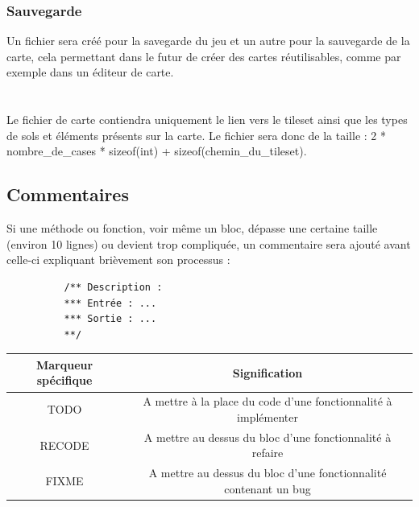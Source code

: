 \documentclass[a4paper]{article}
\newcommand{\alinea}{\hspace*{0.5cm}}
\begin{document}
        \subsubsection{Sauvegarde}
		  \alinea Un fichier sera créé pour la savegarde du jeu et un autre pour la sauvegarde de la carte, cela permettant dans le futur de créer des cartes réutilisables, comme par exemple dans un éditeur de carte.\\
		  \\
		  \alinea %
		  \\
		  \alinea Le fichier de carte contiendra uniquement le lien vers le tileset ainsi que les types de sols et éléments présents sur la carte. Le fichier sera donc de la taille : 2 * nombre\_de\_cases * sizeof(int) + sizeof(chemin\_du\_tileset).\\
      
      \subsection{Commentaires}
        \alinea Si une méthode ou fonction, voir même un bloc, dépasse une certaine taille (environ 10 lignes) ou devient trop compliquée, un commentaire sera ajouté avant celle-ci expliquant brièvement son processus :
        \begin{verbatim}
          /** Description :
          *** Entrée : ...
          *** Sortie : ...
          **/
        \end{verbatim}
        \begin{small}
          \begin{tabular}{| c | c |}
            \hline
            \textbf{Marqueur spécifique} & \textbf{Signification}\\
            \hline
            TODO & A mettre à la place du code d'une fonctionnalité à implémenter\\
            \hline
            RECODE & A mettre au dessus du bloc d'une fonctionnalité à refaire\\
            \hline
            FIXME & A mettre au dessus du bloc d'une fonctionnalité contenant un bug\\
            \hline
          \end{tabular}
        \end{small}
\end{document}
